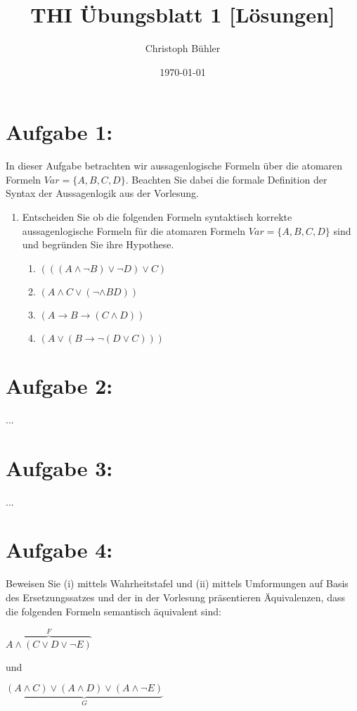 \documentclass[12pt]{article}
\title{THI Übungsblatt 1 [Lösungen]}
\author{Christoph Bühler}
\date{\today}
\begin{document}
  \maketitle

  \section*{Aufgabe 1:}
  In dieser Aufgabe betrachten wir aussagenlogische Formeln über die atomaren Formeln
  \(Var = \{ A, B, C, D \}\). Beachten Sie dabei die formale Definition der Syntax der Aussagenlogik aus der Vorlesung.

    \begin{enumerate}[label=(\alph*)]
      \item Entscheiden Sie ob die folgenden Formeln syntaktisch korrekte aussagenlogische Formeln für die atomaren Formeln \(Var = \{ A, B, C, D \}\) sind und begründen Sie ihre Hypothese.

        \begin{enumerate}[label=(\roman*)]
          \item \((((A \wedge \neg B) \vee \neg D) \vee C)\)
          \item \((A \wedge C \vee (\neg \wedge BD))\)
          \item \((A \rightarrow B \rightarrow (C \wedge D))\)
          \item \((A \vee (B \rightarrow \neg (D \vee C)))\)
        \end{enumerate}
    \end{enumerate}

  \section*{Aufgabe 2:}
  ...
  \section*{Aufgabe 3:}
  ...
  \section*{Aufgabe 4:}
  Beweisen Sie (i) mittels Wahrheitstafel und (ii) mittels Umformungen auf Basis des Ersetzungssatzes und der in der Vorlesung präsentieren Äquivalenzen, dass die folgenden
Formeln semantisch äquivalent sind:

  \begin{center}
    \(\overbrace{A \wedge (C \vee D \vee \neg E)}^{F}\)\par
    und\par
    \(\underbrace{(A \wedge C) \vee (A \wedge D) \vee (A \wedge \neg E)}_{G}\)\par

  \end{center}
\end{document}
